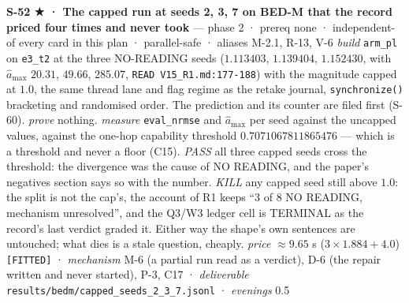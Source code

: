 \documentclass[11pt,a4paper]{article}
\newcounter{none}                 %
\theoremstyle{plain}
\theoremstyle{definition}
\theoremstyle{remark}
\begin{document}
\textbf{S-52 ★ · The capped run at seeds 2, 3, 7 on BED-M that the
record priced four times and never took} --- phase 2 · prereq none ·
independent-of every card in this plan · parallel-safe · aliases M-2.1,
R-13, V-6 \emph{build} \texttt{arm\_pl} on \texttt{e3\_t2} at the three
NO-READING seeds (\(1.113403\), \(1.139404\), \(1.152430\), with
\(\hat a_{\max}\) \(20.31\), \(49.66\), \(285.07\),
\texttt{READ\ V15\_R1.md:177-188}) with the magnitude capped at \(1.0\),
the same thread lane and flag regime as the retake journal,
\texttt{synchronize()} bracketing and randomised order. The prediction
and its counter are filed first (S-60). \emph{prove} nothing.
\emph{measure} \texttt{eval\_nrmse} and \(\hat a_{\max}\) per seed
against the uncapped values, against the one-hop capability threshold
\(0.7071067811865476\) --- which is a threshold and never a floor (C15).
\emph{PASS} all three capped seeds cross the threshold: the divergence
was the cause of NO READING, and the paper's negatives section says so
with the number. \emph{KILL} any capped seed still above \(1.0\): the
split is not the cap's, the account of R1 keeps ``3 of 8 NO READING,
mechanism unresolved'', and the Q3/W3 ledger cell is TERMINAL as the
record's last verdict graded it. Either way the shape's own sentences
are untouched; what dies is a stale question, cheaply. \emph{price}
\(\approx 9.65\) s (\(3\times1.884+4.0\)) \texttt{{[}FITTED{]}} ·
\emph{mechanism} M-6 (a partial run read as a verdict), D-6 (the repair
written and never started), P-3, C17 · \emph{deliverable}
\texttt{results/bedm/capped\_seeds\_2\_3\_7.jsonl} · \emph{evenings} 0.5
\end{document}
